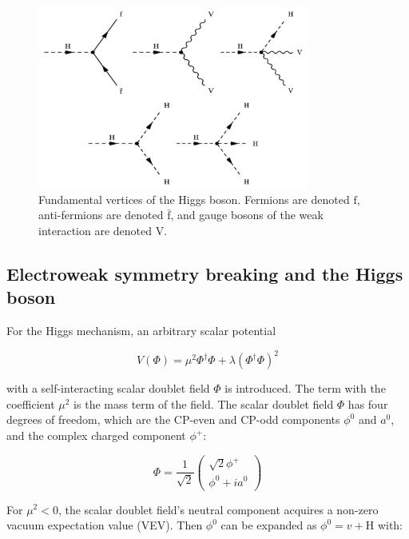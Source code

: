 \begin{figure}[htbp]
  \centering
  \includegraphics[width=0.8\textwidth]{plots/chapter2/h_vertices.png}
  \caption{Fundamental vertices of the Higgs boson. Fermions are denoted $\text{f}$, anti-fermions are denoted $\bar{\text{f}}$, and gauge bosons of the weak interaction are denoted $\text{V}$.}
  \label{fig:h_vertices}
\end{figure}

\subsection{Electroweak symmetry breaking and the Higgs boson}
For the Higgs mechanism, an arbitrary scalar potential

\begin{equation}
  V(\Phi)=\mu^2 \Phi^{\dagger} \Phi+\lambda(\Phi^{\dagger} \Phi)^2
\end{equation}

with a self-interacting scalar doublet field $\Phi$ is introduced. The term with the coefficient $\mu^2$ is the mass term of the field. The scalar doublet field $\Phi$ has four degrees of freedom, which are the CP-even and CP-odd components $\phi^{0}$ and $a^{0}$, and the complex charged component $\phi^{+}$:

\begin{equation}
  \Phi=\frac{1}{\sqrt{2}}\left(
  \begin{array}{c}
    \sqrt{2} \phi^{+} \\
    \phi^{0}+i a^{0}
  \end{array}\right)
\end{equation}

For $\mu^2<0$, the scalar doublet field's neutral component acquires a non-zero vacuum expectation value (VEV). Then $\phi^{0}$ can be expanded as $\phi^{0} = v + \text{H}$ with:

